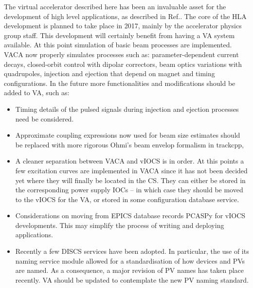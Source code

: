 \documentclass[a4paper,
              ]{jacow}
\begin{document}
The virtual accelerator described here has been an invaluable asset for the development of high level applications, as described in Ref.\cite{sirius_hla}.
The core of the HLA development is planned to take place in 2017, mainly by the accelerator physics group staff. This development will certainly benefit from having a VA system available.
At this point simulation of basic beam processes are implemented.
VACA now properly simulates processes such as: parameter-dependent current decays, closed-orbit control with dipolar correctors, beam optics variations with quadrupoles, injection and ejection that depend on magnet and timing configurations.
In the future more functionalities and modifications should be added to VA, such as:
\begin{itemize}
\item Timing details of the pulsed signals during injection and ejection processes need be considered.
\item Approximate coupling expressions now used for beam size estimates should be replaced with more rigorous Ohmi's beam envelop formalism\cite{ohmi} in trackcpp,
\item A cleaner separation between VACA and vIOCS is in order. At this points a few excitation curves are implemented in VACA since it has not been decided yet where they will finally be located in the CS. They can either be stored in the corresponding power supply IOCs -- in which case they should be moved to the vIOCS for the VA, or stored in some configuration database service.
\item Considerations on moving from EPICS database records PCASPy for vIOCS developments. This may simplify the process of writing and deploying applications.
\item Recently a few DISCS\cite{discs} services have been adopted. In particular, the use of its naming service module allowed for a standardisation of how devices and PVs are named. As a consequence, a major revision of PV names has taken place recently. VA should be updated to contemplate the new PV naming standard.
\end{itemize}
\end{document}
